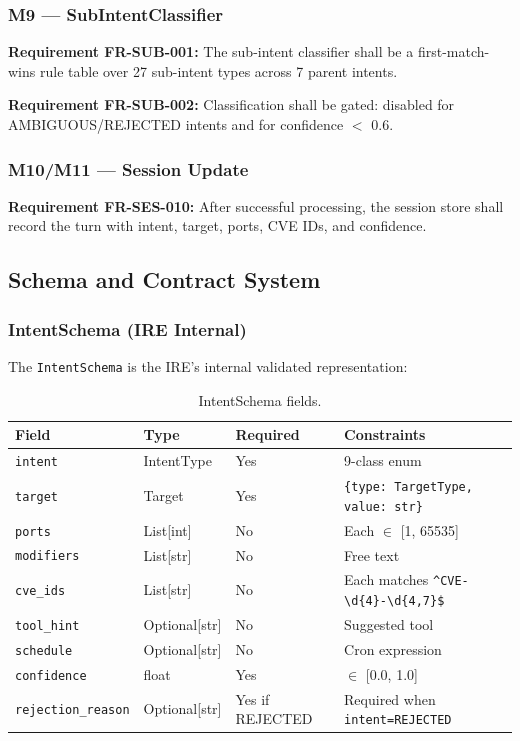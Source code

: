 ﻿\documentclass[10pt,journal,onecolumn]{IEEEtran}
\newcommand{\reqid}[1]{\textbf{#1}}
\begin{document}
\subsubsection{M9 --- SubIntentClassifier}
\reqid{Requirement FR-SUB-001:} The sub-intent classifier shall be a first-match-wins rule table over 27 sub-intent types across 7 parent intents.

\reqid{Requirement FR-SUB-002:} Classification shall be gated: disabled for AMBIGUOUS/REJECTED intents and for confidence $<$ 0.6.

\subsubsection{M10/M11 --- Session Update}
\reqid{Requirement FR-SES-010:} After successful processing, the session store shall record the turn with intent, target, ports, CVE IDs, and confidence.
\subsection{Schema and Contract System}

\subsubsection{IntentSchema (IRE Internal)}
The \texttt{IntentSchema} is the IRE's internal validated representation:
\begin{table}[t]
\caption{IntentSchema fields.}
\label{tab:intentschema}
\begin{tabularx}{\textwidth}{>{\ttfamily}l l l X}
\toprule
\textbf{Field} & \textbf{Type} & \textbf{Required} & \textbf{Constraints}\\
\midrule
\texttt{intent} & IntentType & Yes & 9-class enum\\
\texttt{target} & Target & Yes & \texttt{\{type: TargetType, value: str\}}\\
\texttt{ports} & List[int] & No & Each $\in$ [1, 65535]\\
\texttt{modifiers} & List[str] & No & Free text\\
\texttt{cve\_ids} & List[str] & No & Each matches \texttt{\^{}CVE-\textbackslash d\{4\}-\textbackslash d\{4,7\}\$}\\
\texttt{tool\_hint} & Optional[str] & No & Suggested tool\\
\texttt{schedule} & Optional[str] & No & Cron expression\\
\texttt{confidence} & float & Yes & $\in$ [0.0, 1.0]\\
\texttt{rejection\_reason} & Optional[str] & Yes if REJECTED & Required when \texttt{intent=REJECTED}\\
\bottomrule
\end{tabularx}
\end{table}
\end{document}
